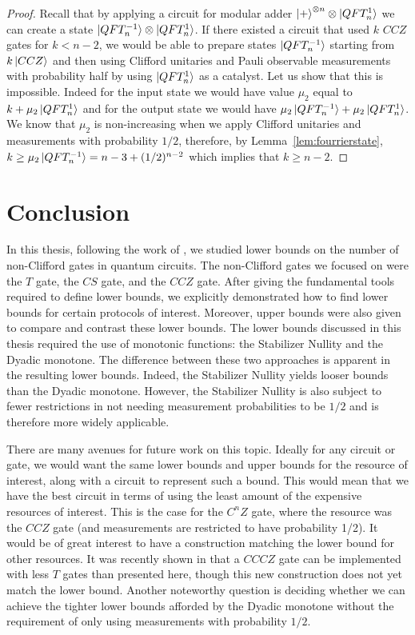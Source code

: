 \documentclass[12pt]{dalthesis}
\begin{document}
\begin{proof}
Recall that by applying a circuit for modular adder $\ket{+}^{\otimes n} \otimes \ket{QFT_n^1}$ we can create a state $\ket{QFT_n^{-1}} \otimes \ket{QFT_n^1}$. If there existed a circuit that used $k$ $CCZ$ gates for $k < n-2$, we would be able to prepare states $\ket{QFT_n^{-1}}$ starting from $k \ket{CCZ}$ and then using Clifford unitaries and Pauli observable measurements with probability half by using $\ket{QFT_n^1}$ as a catalyst. Let us show that this is impossible. Indeed for the input state we would have value $\mu_2$ equal to $k + \mu_2 \ket{QFT_n^1}$ and for the output state we would have $\mu_2 \ket{QFT_n^{-1}} + \mu_2 \ket{QFT_n^1}$. We know that $\mu_2$ is non-increasing when we apply Clifford unitaries and measurements with probability $1/2$, therefore, by Lemma~\ref{lem:fourrierstate}, $k \geq \mu_2 \ket{QFT_n^{-1}} = n - 3 +(1/2)^{n-2}$ which implies that $k \geq n-2$.
\end{proof}

\chapter{Conclusion}
\label{Conclusion}
In this thesis, following the work of \cite{beverland2019lower}, we studied lower bounds on the number of non-Clifford gates in quantum circuits. The non-Clifford gates we focused on were the $T$ gate, the $CS$ gate, and the $CCZ$ gate. After giving the fundamental tools required to define lower bounds, we explicitly demonstrated how to find lower bounds for certain protocols of interest. Moreover, upper bounds were also given to compare and contrast these lower bounds. The lower bounds discussed in this thesis required the use of monotonic functions: the Stabilizer Nullity and the Dyadic monotone.  The difference between these two approaches is apparent in the resulting lower bounds. Indeed, the Stabilizer Nullity yields looser  bounds than the Dyadic monotone. However, the Stabilizer Nullity is also subject to fewer restrictions in not needing measurement probabilities to be $1/2$ and is therefore more widely applicable.

There are many avenues for future work on this topic. Ideally for any circuit or gate, we would want the same lower bounds and upper bounds for the resource of interest, along with a circuit to represent such a bound. This would mean that we have the best circuit in terms of using the least amount of the expensive resources of interest. This is the case for the $C^nZ$ gate, where the resource was the $CCZ$ gate (and measurements are restricted to have probability 1/2). It would be of great interest to have a construction matching the lower bound for other resources. It was recently shown in \cite{gidney2021cccz} that a $CCCZ$ gate can be implemented with less $T$ gates than presented here, though this new construction does not yet match the lower bound. Another noteworthy question is deciding whether we can achieve the tighter lower bounds afforded by the Dyadic monotone without the requirement of only using measurements with probability $1/2$.
\end{document}
